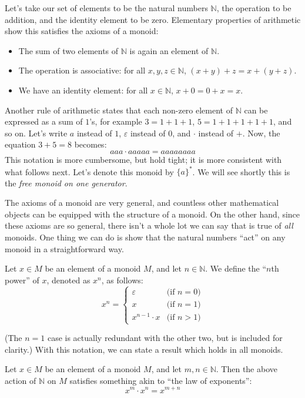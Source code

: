 \documentclass[../generics]{subfiles}
\begin{document}
\begin{example}
%
Let's take our set of elements to be the natural numbers $\mathbb{N}$, the operation to be addition, and the identity element to be zero. Elementary properties of arithmetic show this satisfies the axioms of a monoid:
\begin{itemize}
\item The sum of two elements of $\mathbb{N}$ is again an element of $\mathbb{N}$.
\item The operation is associative: for all $x,y,z\in\mathbb{N}$, $(x+y)+z=x+(y+z)$.
\item We have an identity element: for all $x\in\mathbb{N}$, $x+0=0+x=x$.
\end{itemize}
Another rule of arithmetic states that each non-zero element of $\mathbb{N}$ can be expressed as a sum of $1$'s, for example $3=1+1+1$, $5=1+1+1+1+1$, and so on. Let's write $a$ instead of $1$, $\varepsilon$ instead of $0$, and $\cdot$ instead of $+$. Now, the equation $3+5=8$ becomes:
\[aaa\cdot aaaaa=aaaaaaaa\]
This notation is more cumbersome, but hold tight; it is more consistent with what follows next. Let's denote this monoid by $\{a\}^*$. We will see shortly this is the \emph{free monoid on one generator}.
\end{example}
The axioms of a monoid are very general, and countless other mathematical objects can be equipped with the structure of a monoid. On the other hand, since these axioms are so general, there isn't a whole lot we can say that is true of \emph{all} monoids. One thing we can do is show that the natural numbers ``act'' on any monoid in a straightforward way.
\begin{definition}
Let $x\in M$ be an element of a monoid $M$, and let $n\in\mathbb{N}$. We define the ``$n$th power'' of $x$, denoted as $x^n$, as follows:
\[
x^n = \begin{cases}
\varepsilon&\text{(if $n=0$)}\\
x&\text{(if $n=1$)}\\
x^{n-1}\cdot x&\text{(if $n>1$)}
\end{cases}
\]
\end{definition}
(The $n=1$ case is actually redundant with the other two, but is included for clarity.) With this notation, we can state a result which holds in all monoids.
\begin{proposition}\label{monoid exp law}
Let $x\in M$ be an element of a monoid $M$, and let $m,n\in\mathbb{N}$. Then the above action of $\mathbb{N}$ on $M$ satisfies something akin to ``the law of exponents'':
\[x^m\cdot x^n=x^{m+n}\]
\end{proposition}
\end{document}
